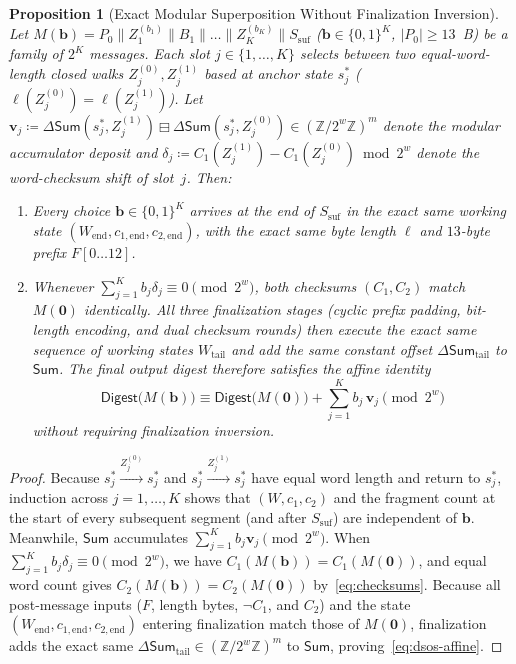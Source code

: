 \documentclass[11pt,a4paper]{article}
\newtheorem{proposition}[theorem]{Proposition}
\theoremstyle{definition}
\theoremstyle{remark}
\newcommand{\Zmod}[1]{\mathbb{Z}/2^{#1}\mathbb{Z}}
\newcommand{\SumAcc}{\mathsf{Sum}}
\begin{document}
\begin{proposition}[Exact Modular Superposition Without Finalization Inversion]
\label{prop:c-inv-zero}
Let $M(\mathbf{b}) = P_0 \| Z_1^{(b_1)} \| B_1 \| \dots \| Z_K^{(b_K)} \| S_{\mathrm{suf}}$ ($\mathbf{b} \in \{0,1\}^K$, $|P_0| \ge 13$~B) be a family of $2^K$ messages. Each slot $j \in \{1, \dots, K\}$ selects between two equal-word-length closed walks $Z_j^{(0)}, Z_j^{(1)}$ based at anchor state $s_j^*$ ($\ell(Z_j^{(0)}) = \ell(Z_j^{(1)})$). Let $\mathbf{v}_j \coloneqq \Delta\SumAcc(s_j^*, Z_j^{(1)}) \boxminus \Delta\SumAcc(s_j^*, Z_j^{(0)}) \in (\Zmod{w})^m$ denote the modular accumulator deposit and $\delta_j \coloneqq C_1(Z_j^{(1)}) - C_1(Z_j^{(0)}) \bmod 2^w$ denote the word-checksum shift of slot~$j$. Then:
\begin{enumerate}[leftmargin=2em]
    \item Every choice $\mathbf{b} \in \{0,1\}^K$ arrives at the end of $S_{\mathrm{suf}}$ in the exact same working state $(W_{\mathrm{end}}, c_{1,\mathrm{end}}, c_{2,\mathrm{end}})$, with the exact same byte length $\ell$ and $13$-byte prefix $F[0 \dots 12]$.
    \item Whenever $\sum_{j=1}^{K} b_j \delta_j \equiv 0 \pmod{2^w}$, both checksums $(C_1, C_2)$ match $M(\mathbf{0})$ identically. All three finalization stages (cyclic prefix padding, bit-length encoding, and dual checksum rounds) then execute the exact same sequence of working states $W_{\mathrm{tail}}$ and add the same constant offset $\Delta\SumAcc_{\mathrm{tail}}$ to $\SumAcc$. The final output digest therefore satisfies the affine identity
    \begin{equation}
        \mathsf{Digest}\bigl(M(\mathbf{b})\bigr) \equiv \mathsf{Digest}\bigl(M(\mathbf{0})\bigr) + \sum_{j=1}^{K} b_j\,\mathbf{v}_j \pmod{2^w}
        \label{eq:dsos-affine}
    \end{equation}
    without requiring finalization inversion.
\end{enumerate}
\end{proposition}

\begin{proof}
Because $s_j^* \xrightarrow{Z_j^{(0)}} s_j^*$ and $s_j^* \xrightarrow{Z_j^{(1)}} s_j^*$ have equal word length and return to $s_j^*$, induction across $j = 1, \dots, K$ shows that $(W, c_1, c_2)$ and the fragment count at the start of every subsequent segment (and after $S_{\mathrm{suf}}$) are independent of $\mathbf{b}$. Meanwhile, $\SumAcc$ accumulates $\sum_{j=1}^{K} b_j \mathbf{v}_j \pmod{2^w}$. When $\sum_{j=1}^K b_j \delta_j \equiv 0 \pmod{2^w}$, we have $C_1(M(\mathbf{b})) = C_1(M(\mathbf{0}))$, and equal word count gives $C_2(M(\mathbf{b})) = C_2(M(\mathbf{0}))$ by~\eqref{eq:checksums}. Because all post-message inputs ($F$, length bytes, $\neg C_1$, and $C_2$) and the state $(W_{\mathrm{end}}, c_{1,\mathrm{end}}, c_{2,\mathrm{end}})$ entering finalization match those of $M(\mathbf{0})$, finalization adds the exact same $\Delta\SumAcc_{\mathrm{tail}} \in (\Zmod{w})^m$ to $\SumAcc$, proving~\eqref{eq:dsos-affine}.
\end{proof}
\end{document}
